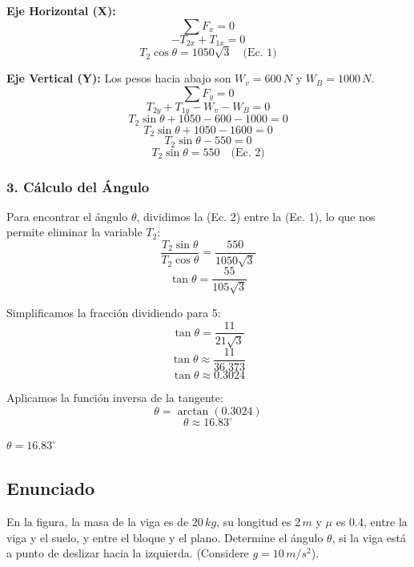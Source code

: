 \documentclass[12pt, a4paper]{article}
\begin{document}
\textbf{Eje Horizontal (X):}
$$\sum F_x = 0$$
$$-T_{2x} + T_{1x} = 0$$
$$T_2 \cos\theta = 1050\sqrt{3} \quad \text{(Ec. 1)}$$

\textbf{Eje Vertical (Y):}
Los pesos hacia abajo son $W_v = 600 \, \si{N}$ y $W_B = 1000 \, \si{N}$.
$$\sum F_y = 0$$
$$T_{2y} + T_{1y} - W_v - W_B = 0$$
$$T_2 \sin\theta + 1050 - 600 - 1000 = 0$$
$$T_2 \sin\theta + 1050 - 1600 = 0$$
$$T_2 \sin\theta - 550 = 0$$
$$T_2 \sin\theta = 550 \quad \text{(Ec. 2)}$$

\subsubsection*{3. Cálculo del Ángulo}
Para encontrar el ángulo $\theta$, dividimos la (Ec. 2) entre la (Ec. 1), lo que nos permite eliminar la variable $T_2$:
$$\frac{T_2 \sin\theta}{T_2 \cos\theta} = \frac{550}{1050\sqrt{3}}$$
$$\tan\theta = \frac{55}{105\sqrt{3}}$$

Simplificamos la fracción dividiendo para 5:
$$\tan\theta = \frac{11}{21\sqrt{3}}$$
$$\tan\theta \approx \frac{11}{36.373}$$
$$\tan\theta \approx 0.3024$$

Aplicamos la función inversa de la tangente:
$$\theta = \arctan(0.3024)$$
$$\theta \approx 16.83^\circ$$

\begin{tcolorbox}[colback=green!5!white, colframe=green!50!black, title=Respuesta Final]
\centering \Large $\theta = 16.83^\circ$
\end{tcolorbox}

\newpage

\subsection*{Enunciado}
En la figura, la masa de la viga es de $20 \, \si{kg}$, su longitud es $2 \, \si{m}$ y $\mu$ es $0.4$, entre la viga y el suelo, y entre el bloque y el plano. Determine el ángulo $\theta$, si la viga está a punto de deslizar hacia la izquierda. (Considere $g=10\,\si{m/s^2}$).
\end{document}
